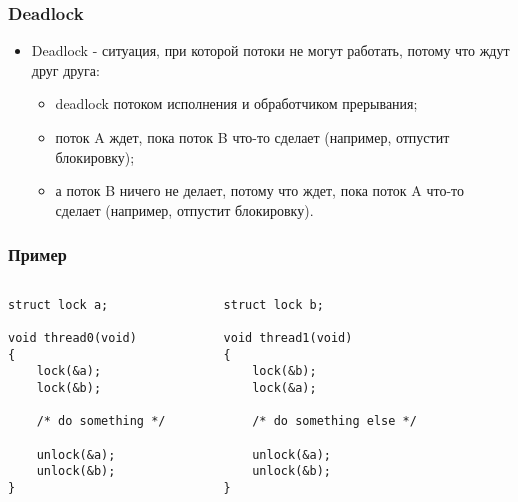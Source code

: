 \begin{frame}
\frametitle{Deadlock}
\begin{itemize}
    \item<1->Deadlock - ситуация, при которой потоки не могут работать,
         потому что ждут друг друга:
    \begin{itemize}
        \item<2->deadlock потоком исполнения и обработчиком прерывания;
        \item<3->поток A ждет, пока поток B что-то сделает (например, отпустит
             блокировку);
        \item<4->а поток B ничего не делает, потому что ждет, пока поток A
             что-то сделает (например, отпустит блокировку).
    \end{itemize}
\end{itemize}
\end{frame}

\begin{frame}[fragile]
\frametitle{Пример}
\begin{columns}
    \begin{column}{.35\textwidth}
        \begin{lstlisting}
struct lock a;

void thread0(void)
{
    lock(&a);
    lock(&b);

    /* do something */

    unlock(&a);
    unlock(&b);
}
        \end{lstlisting}
    \end{column}
    \begin{column}{.35\textwidth}
        \begin{lstlisting}
struct lock b;

void thread1(void)
{
    lock(&b);
    lock(&a);

    /* do something else */

    unlock(&a);
    unlock(&b);
}
        \end{lstlisting}
    \end{column}
    \begin{column}{.3\textwidth}
    \end{column}
\end{columns}
\end{frame}

